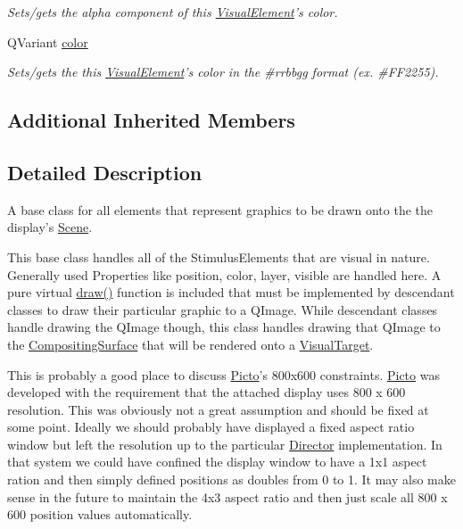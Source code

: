 \begin{DoxyCompactItemize}
\begin{DoxyCompactList}\small\item\em Sets/gets the alpha component of this \hyperlink{struct_picto_1_1_visual_element}{Visual\-Element}'s color. \end{DoxyCompactList}\item 
Q\-Variant \hyperlink{struct_picto_1_1_visual_element_a45c3042c969717eb2ab60373369c7de7}{color}
\begin{DoxyCompactList}\small\item\em Sets/gets the this \hyperlink{struct_picto_1_1_visual_element}{Visual\-Element}'s color in the \#rrbbgg format (ex. \#\-F\-F2255). \end{DoxyCompactList}\end{DoxyCompactItemize}
\subsection*{Additional Inherited Members}


\subsection{Detailed Description}
A base class for all elements that represent graphics to be drawn onto the the display's \hyperlink{class_picto_1_1_scene}{Scene}. 

This base class handles all of the Stimulus\-Elements that are visual in nature. Generally used Properties like position, color, layer, visible are handled here. A pure virtual \hyperlink{struct_picto_1_1_visual_element_ad4a2003a51dadee2e5867abfafba68c1}{draw()} function is included that must be implemented by descendant classes to draw their particular graphic to a Q\-Image. While descendant classes handle drawing the Q\-Image though, this class handles drawing that Q\-Image to the \hyperlink{struct_picto_1_1_compositing_surface}{Compositing\-Surface} that will be rendered onto a \hyperlink{class_picto_1_1_visual_target}{Visual\-Target}.

This is probably a good place to discuss \hyperlink{namespace_picto}{Picto}'s 800x600 constraints. \hyperlink{namespace_picto}{Picto} was developed with the requirement that the attached display uses 800 x 600 resolution. This was obviously not a great assumption and should be fixed at some point. Ideally we should probably have displayed a fixed aspect ratio window but left the resolution up to the particular \hyperlink{class_director}{Director} implementation. In that system we could have confined the display window to have a 1x1 aspect ration and then simply defined positions as doubles from 0 to 1. It may also make sense in the future to maintain the 4x3 aspect ratio and then just scale all 800 x 600 position values automatically.


